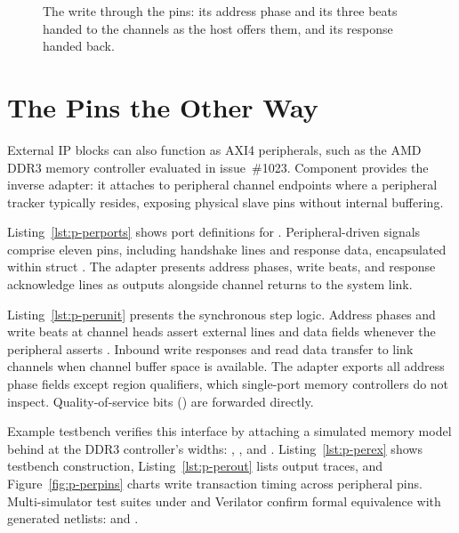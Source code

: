 \documentclass[journal,9pt]{IEEEtran}
\newcommand{\perpinspart}[3]{%
}
\begin{document}


\begin{figure}[htbp]
\centering

\caption{The write through the pins: its address phase and its three
beats handed to the channels as the host offers them, and its response
handed back.}
\label{fig:p-pins}
\end{figure}

\section{The Pins the Other Way}
\label{sec:p-perpins}

External IP blocks can also function as AXI4 peripherals, such as the AMD DDR3
memory controller evaluated in issue~\#1023. Component  provides
the inverse adapter: it attaches to peripheral channel endpoints where a
peripheral tracker typically resides, exposing physical slave pins without
internal buffering.

\perpinspart{ports}{The pins, the other way.}{lst:p-perports}

Listing~\ref{lst:p-perports} shows port definitions for .
Peripheral-driven signals comprise eleven pins, including handshake lines and
response data, encapsulated within struct . The adapter
presents address phases, write beats, and response acknowledge lines as outputs
alongside channel returns to the system link.

\perpinspart{unit}{\code{AxiPerPins}: the step.}{lst:p-perunit}

Listing~\ref{lst:p-perunit} presents the synchronous step logic. Address phases
and write beats at channel heads assert external  lines and data
fields whenever the peripheral asserts . Inbound write responses and
read data transfer to link channels when channel buffer space is available. The
adapter exports all address phase fields except region qualifiers, which
single-port memory controllers do not inspect. Quality-of-service bits
() are forwarded directly.

Example testbench  verifies this interface by attaching
a simulated memory model behind  at the DDR3
controller's widths: , ,  and
. Listing~\ref{lst:p-perex} shows testbench construction,
Listing~\ref{lst:p-perout} lists output traces, and Figure~\ref{fig:p-perpins}
charts write transaction timing across peripheral pins. Multi-simulator test
suites under  and Verilator confirm formal equivalence with generated
netlists:  and
.
\end{document}
